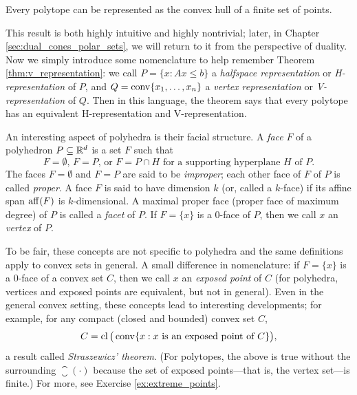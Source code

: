 \begin{Theorem}
\label{thm:v_representation}
Every polytope can be represented as the convex hull of a finite set of points. 
\end{Theorem}


This result is both highly intuitive and highly nontrivial; later, in Chapter
\ref{sec:dual_cones_polar_sets}, we will return to it from the perspective of
duality. Now we simply introduce some nomenclature to help
remember Theorem \ref{thm:v_representation}: we call $P = \{x : Ax \leq
b\}$ a \emph{halfspace representation} or \emph{H-representation} of $P$, and $Q
=  \operatorname{conv}\{x_1,\ldots,x_n\}$ a \emph{vertex representation} or  
\emph{V-representation} of $Q$. Then in this language, the theorem 
says that every polytope has an equivalent H-representation and
V-representation.   

An interesting aspect of polyhedra is their facial structure. A \emph{face} $F$
of a polyhedron $P \subseteq \mathbb{R}^d$ is a set $F$ such that 
\[
\text{$F = \emptyset$, $F = P$, or $F = P \cap H$ for a supporting hyperplane
  $H$ of $P$}. 
\]
The faces $F=\emptyset$ and $F=P$ are said to be \emph{improper}; each other
face of $F$ of $P$ is called \emph{proper}. A face $F$ is said to have dimension
$k$ (or, called a $k$-face) if its affine span $\operatorname{aff}(F)$ is $k$-dimensional. A
maximal proper face (proper face of maximum degree) of $P$ is called a
\emph{facet} of $P$. If $F=\{x\}$ is a $0$-face of $P$, then we call $x$ an
\emph{vertex} of $P$. 

To be fair, these concepts are not specific to polyhedra and the same
definitions apply to convex sets in general. A small difference in
nomenclature: if $F = \{x\}$ is a $0$-face of a convex set $C$, then we call $x$
an \emph{exposed point} of $C$ (for polyhedra, vertices and exposed points 
are equivalent, but not in general). Even in the general convex setting, these
concepts lead to interesting developments; for example, for any compact (closed
and bounded) convex set $C$, 
\[
C = \operatorname{cl}\big(\operatorname{conv}\{x : \text{$x$ is an exposed point of $C$}\}\big),  
\]
a result called \emph{Straszewicz' theorem}. (For polytopes, the above is true
without the surrounding $\closure(\cdot)$ because the set of exposed
points---that is, the vertex set---is finite.) For more, see Exercise
\ref{ex:extreme_points}. 

